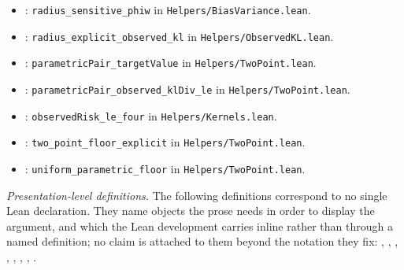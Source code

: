 \begin{itemize}
\item {}: \texttt{radius\_sensitive\_phiw} in \texttt{Helpers/BiasVariance.lean}.
\item {}: \texttt{radius\_explicit\_observed\_kl} in \texttt{Helpers/ObservedKL.lean}.
\item {}: \texttt{parametricPair\_targetValue} in \texttt{Helpers/TwoPoint.lean}.
\item {}: \texttt{parametricPair\_observed\_klDiv\_le} in \texttt{Helpers/TwoPoint.lean}.
\item {}: \texttt{observedRisk\_le\_four} in \texttt{Helpers/Kernels.lean}.
\item {}: \texttt{two\_point\_floor\_explicit} in \texttt{Helpers/TwoPoint.lean}.
\item {}: \texttt{uniform\_parametric\_floor} in \texttt{Helpers/TwoPoint.lean}.
\end{itemize}

\emph{Presentation-level definitions.} The following definitions correspond to no single Lean declaration. They name objects the prose needs in order to display the argument, and which the Lean development carries inline rather than through a named definition; no claim is attached to them beyond the notation they fix: , , , , , , , .
